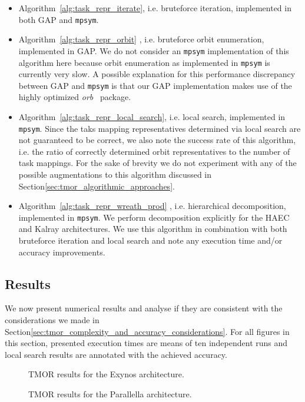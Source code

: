 \begin{itemize}
\item Algorithm~\ref{alg:task_repr_iterate}, i.e. bruteforce iteration,
implemented in both GAP and \texttt{mpsym}.

\item Algorithm~\ref{alg:task_repr_orbit} , i.e. bruteforce orbit enumeration,
implemented in GAP. We do not consider an \texttt{mpsym} implementation of this
algorithm here because orbit enumeration as implemented in \texttt{mpsym} is
currently very slow. A possible explanation for this performance discrepancy
between GAP and \texttt{mpsym} is that our GAP implementation makes use of the
highly optimized \textit{orb}~\cite{orb} package.

\item Algorithm~\ref{alg:task_repr_local_search}, i.e. local search,
implemented in \texttt{mpsym}. Since the taks mapping representatives
determined via local search are not guaranteed to be correct, we also note the
success rate of this algorithm, i.e. the ratio of correctly determined orbit
representatives to the number of task mappings.  For the sake of brevity we do
not experiment with any of the possible augmentations to this algorithm
discussed in Section\ref{sec:tmor_algorithmic_approaches}.

\item Algorithm~\ref{alg:task_repr_wreath_prod} , i.e. hierarchical
decomposition, implemented in \texttt{mpsym}. We perform decomposition
explicitly for the HAEC and Kalray architectures. We use this algorithm in
combination with both bruteforce iteration and local search and note any
execution time and/or accuracy improvements.
\end{itemize}

\subsection{Results}
\label{sec:exp_repr_results}

We now present numerical results and analyse if they are consistent with the
considerations we made in
Section\ref{sec:tmor_complexity_and_accuracy_considerations}.  For all figures
in this section, presented execution times are means of ten independent runs
and local search results are annotated with the achieved accuracy.

\begin{figure}
  \centering
  \caption{TMOR results for the Exynos architecture.}
  \label{fig:exynos_lineplot}
  \vspace{1cm}
  \caption{TMOR results for the Parallella architecture.}
  \label{fig:parallella_lineplot}
\end{figure}

